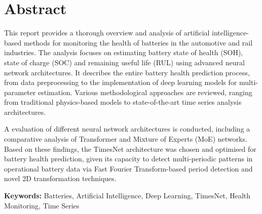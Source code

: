 \begingroup
\let\clearpage\relax
\let\cleardoublepage\relax

\chapter*{Abstract}

This report provides a thorough overview and analysis of artificial intelligence-based methods for monitoring the health of batteries in the automotive and rail industries. The analysis focuses on estimating battery state of health (SOH), state of charge (SOC) and remaining useful life (RUL) using advanced neural network architectures. It describes the entire battery health prediction process, from data preprocessing to the implementation of deep learning models for multi-parameter estimation. Various methodological approaches are reviewed, ranging from traditional physics-based models to state-of-the-art time series analysis architectures.

A evaluation of different neural network architectures is conducted, including a comparative analysis of Transformer and Mixture of Experts (MoE) networks. Based on these findings, the TimesNet architecture was chosen and optimised for battery health prediction, given its capacity to detect multi-periodic patterns in operational battery data via Fast Fourier Transform-based period detection and novel 2D transformation techniques.

\vspace{0.5cm}
\noindent\textbf{Keywords:} Batteries, Artificial Intelligence, Deep Learning, TimesNet, Health Monitoring, Time Series


\bigskip

\endgroup